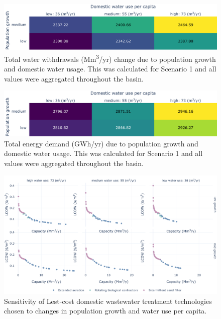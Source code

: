 \documentclass[12pt]{iopart}
\begin{document}
\begin{figure}[!h]
	\centering
	\includegraphics[width=\textwidth]{PopSensitivityWaterAll}
	\caption{Total water withdrawals (Mm\textsuperscript{3}/yr) change due to population growth and domestic water usage. This was calculated for Scenario 1 and all values were aggregated throughout the basin.}
	\label{fig:popasenswaterall}
\end{figure}

\begin{figure}[!h]
	\centering
	\includegraphics[width=\textwidth]{PopSensitivityEnergyAll}
	\caption{Total energy demand (GWh/yr)  due to population growth and domestic water usage. This was calculated for Scenario 1 and all values were aggregated throughout the basin.}
	\label{fig:popasensenergyall}
\end{figure}

\begin{figure}[!h]
	\centering
	\includegraphics[width=\textwidth]{PopSensitivityLeastCost}
	\caption{Sensitivity of Lest-cost domestic wastewater treatment technologies chosen to changes in population growth and water use per capita.}
	\label{fig:popasensleastcost}
\end{figure}
\end{document}
